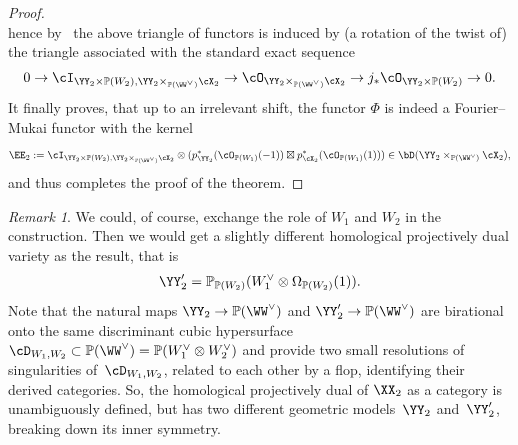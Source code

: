 \documentclass[11pt]{amsart}
\renewcommand{\P}{{\mathbb{P}}}
\theoremstyle{plain}
\theoremstyle{definition}
\theoremstyle{remark}
\newtheorem{remark}[theorem]{Remark}
\begin{document}
\begin{proof}
\begin{equation*}
\end{equation*}
hence by~\cite{anno2012adjunction} the above triangle of functors is induced by (a rotation of the twist of) 
the triangle associated with the standard exact sequence
\begin{equation*}
0 \to \cI_{{\YY_2} \times \P(W_2), {\YY_2} \times_{\P(\WW^\vee)} {\cX_2}} \to \cO_{{\YY_2} \times_{\P(\WW^\vee)} {\cX_2}} \to j_*\cO_{{\YY_2} \times \P(W_2)} \to 0.
\end{equation*}
It finally proves, that up to an irrelevant shift, the functor $\Phi$ is indeed a Fourier--Mukai functor with the kernel
\begin{equation}\label{eq:hpd-kernel-xx3}
\EE_2 := \cI_{{\YY_2} \times \P(W_2), {\YY_2} \times_{\P(\WW^\vee)} {\cX_2}} \otimes (p_{\YY_2}^*(\cO_{\P(W_1)}(-1)) \boxtimes p_{\cX_2}^*(\cO_{\P(W_1)}(1))) \in \bD({\YY_2} \times_{\P(\WW^\vee)} \cX_2),
\end{equation}
and thus completes the proof of the theorem.
\end{proof}

\begin{remark}
We could, of course, exchange the role of $W_1$ and $W_2$ in the construction.
Then we would get a slightly different homological projectively dual variety as the result, that is
\begin{equation*}
\YY_2' = \P_{\P(W_2)}(W_1^\vee \otimes \Omega_{\P(W_2)}(1)).
\end{equation*}
Note that the natural maps $\YY_2 \to \P(\WW^\vee)$ and $\YY_2' \to \P(\WW^\vee)$ are birational onto the same discriminant cubic hypersurface $\cD_{W_1,W_2} \subset \P(\WW^\vee) = \P(W_1^\vee \otimes W_2^\vee)$
and provide two small resolutions of singularities of~$\cD_{W_1,W_2}$, related to each other by a flop, identifying their derived categories.
So, the homological projectively dual of $\XX_2$ as a category is unambiguously defined, but has two different geometric models~$\YY_2$ and~$\YY_2'$, breaking down its inner symmetry.
\end{remark}
\end{document}
